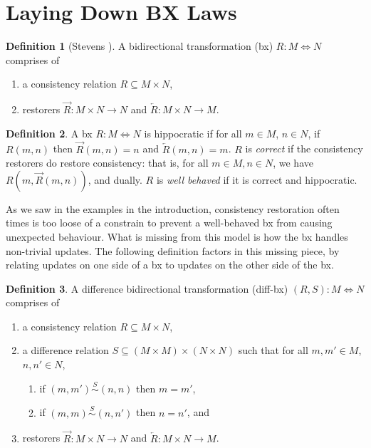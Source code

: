 \documentclass[acmsmall,review,anonymous]{acmart}\settopmatter{printfolios=true,printccs=false,printacmref=false}
\theoremstyle{definition}
\newtheorem{definition}{Definition}
\begin{document}
\section{Laying Down BX Laws}
\begin{definition}[Stevens \cite{stevens2010bidirectional}]
A bidirectional transformation (bx) $R : M \Leftrightarrow N$ comprises of 
\begin{enumerate}
\item
a consistency relation $R \subseteq M \times N$,
\item
restorers $\overrightarrow{R} : M \times N \rightarrow N$ and $\overleftarrow{R} : M \times N \longrightarrow
M$.
\end{enumerate}
\end{definition}

\begin{definition}
A bx $R : M \Leftrightarrow N$ is hippocratic if for all $m \in M$, $n \in N$, if $R(m, n)$ then $\overrightarrow{R}(m, n) = n$ and $\overleftarrow{R}(m,n) = m$. $R$ is {\em correct} if the consistency restorers do restore consistency: that is, for all $m \in M, n \in N$, we have $R(m, \overrightarrow{R}(m, n))$, and dually. $R$ is {\em well behaved} if it is correct and hippocratic.
\end{definition}
As we saw in the examples in the introduction, consistency restoration often times is too loose of a constrain to prevent a well-behaved bx from causing unexpected behaviour. What is missing from this model is how the bx handles non-trivial updates. The following definition factors in this missing piece, by relating updates on one side of a bx to updates on the other side of the bx.
\begin{definition}
A difference bidirectional transformation (diff-bx) $(R,S) : M \Leftrightarrow N$ comprises of 
\begin{enumerate}
\item
a consistency relation $R \subseteq M \times N$,
\item
a difference relation $S \subseteq (M \times M) \times (N \times N)$ such that for all $m, m' \in M$, $n, n' \in N$,
\begin{enumerate}
\item
if $(m, m') \stackrel{S}{\sim} (n, n)$ then $m = m'$,
\item
if $(m, m) \stackrel{S}{\sim} (n, n')$ then $n = n'$, and
\end{enumerate}
\item
restorers $\overrightarrow{R} : M \times N \rightarrow N$ and $\overleftarrow{R} : M \times N \longrightarrow
M$.
\end{enumerate}
\end{definition}
\end{document}
